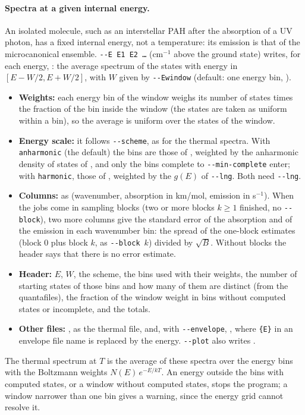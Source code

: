 \paragraph{Spectra at a given internal energy.} An isolated molecule, such
as an interstellar PAH after the absorption of a UV photon, has a fixed
internal energy, not a temperature: its emission is that of the
microcanonical ensemble. \texttt{-{}-E E1 E2 \ldots} (cm$^{-1}$ above the
ground state) writes, for each energy, :
the average spectrum of the states with energy in $[E - W/2, E + W/2]$,
with $W$ given by \texttt{-{}-Ewindow} (default: one energy bin,
).
\begin{itemize}
\item \textbf{Weights:} each energy bin of the window weighs its number
  of states times the fraction of the bin inside the window (the states
  are taken as uniform within a bin), so the average is uniform over the
  states of the window.
\item \textbf{Energy scale:} it follows \texttt{-{}-scheme}, as for the
  thermal spectra. With \texttt{anharmonic} (the default) the bins are
  those of , weighted by the anharmonic
  density of states of , and only the bins complete to
  \texttt{-{}-min-complete} enter; with \texttt{harmonic}, those of
  , weighted by the $g(E)$ of
  \texttt{-{}-lng}. Both need \texttt{-{}-lng}.
\item \textbf{Columns:} as  (wavenumber,
  absorption in km/mol, emission in s$^{-1}$). When the jobs come in
  sampling blocks (two or more blocks $k \ge 1$ finished, no
  \texttt{-{}-block}), two more columns give the standard error of the
  absorption and of the emission in each wavenumber bin: the spread of
  the one-block estimates (block 0 plus block $k$, as
  \texttt{-{}-block}~$k$) divided by $\sqrt{B}$. Without blocks the header
  says that there is no error estimate.
\item \textbf{Header:} $E$, $W$, the scheme, the bins used with their
  weights, the number of starting states of those bins and how many of
  them are distinct (from the quantafiles), the fraction of the window
  weight in bins without computed states or incomplete, and the totals.
\item \textbf{Other files:} ,
  as the thermal  file, and, with
  \texttt{-{}-envelope}, , where
  \texttt{\{E\}} in an envelope file name is replaced by the energy.
  \texttt{-{}-plot} also writes .
\end{itemize}
The thermal spectrum at $T$ is the average of these spectra over the
energy bins with the Boltzmann weights $N(E)\,e^{-E/kT}$. An energy
outside the bins with computed states, or a window without computed
states, stops the program; a window narrower than one bin gives a
warning, since the energy grid cannot resolve it.
